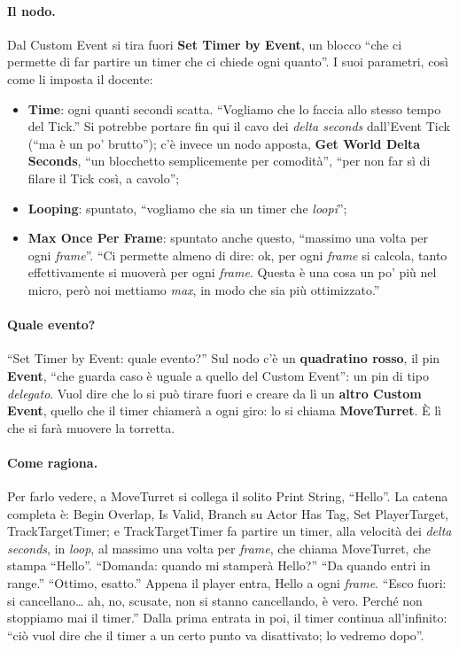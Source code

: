 \paragraph{Il nodo.} Dal Custom Event si tira fuori \textbf{Set Timer by Event}, un
blocco ``che ci permette di far partire un timer che ci chiede ogni quanto''. I suoi
parametri, così come li imposta il docente:
\begin{itemize}
  \item \textbf{Time}: ogni quanti secondi scatta. ``Vogliamo che lo faccia allo stesso
        tempo del Tick.'' Si potrebbe portare fin qui il cavo dei \emph{delta seconds}
        dall'Event Tick (``ma è un po' brutto''); c'è invece un nodo apposta,
        \textbf{Get World Delta Seconds}, ``un blocchetto semplicemente per comodità'',
        ``per non far sì di filare il Tick così, a cavolo'';
  \item \textbf{Looping}: spuntato, ``vogliamo che sia un timer che \emph{loopi}'';
  \item \textbf{Max Once Per Frame}: spuntato anche questo, ``massimo una volta per
        ogni \emph{frame}''. ``Ci permette almeno di dire: ok, per ogni \emph{frame} si
        calcola, tanto effettivamente si muoverà per ogni \emph{frame}. Questa è una
        cosa un po' più nel micro, però noi mettiamo \emph{max}, in modo che sia più
        ottimizzato.''
\end{itemize}

\paragraph{Quale evento?} ``Set Timer by Event: quale evento?'' Sul nodo c'è un
\textbf{quadratino rosso}, il pin \textbf{Event}, ``che guarda caso è uguale a quello del
Custom Event'': un pin di tipo \emph{delegato}. Vuol dire che lo si può tirare fuori e
creare da lì un \textbf{altro Custom Event}, quello che il timer chiamerà a ogni giro:
lo si chiama \textbf{MoveTurret}. È lì che si farà muovere la torretta.

\paragraph{Come ragiona.} Per farlo vedere, a MoveTurret si collega il solito Print
String, ``Hello''. La catena completa è: Begin Overlap, Is Valid, Branch su Actor Has
Tag, Set PlayerTarget, TrackTargetTimer; e TrackTargetTimer fa partire un timer, alla
velocità dei \emph{delta seconds}, in \emph{loop}, al massimo una volta per
\emph{frame}, che chiama MoveTurret, che stampa ``Hello''. ``Domanda: quando mi
stamperà Hello?'' ``Da quando entri in range.'' ``Ottimo, esatto.'' Appena il player
entra, Hello a ogni \emph{frame}. ``Esco fuori: si cancellano\ldots{} ah, no, scusate,
non si stanno cancellando, è vero. Perché non stoppiamo mai il timer.'' Dalla prima
entrata in poi, il timer continua all'infinito: ``ciò vuol dire che il timer a un certo
punto va disattivato; lo vedremo dopo''.

